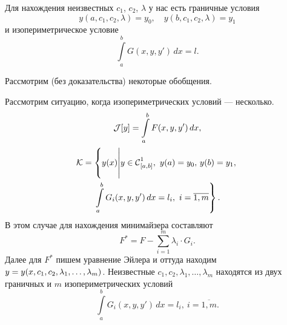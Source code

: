 Для нахождения неизвестных $c_1$, $c_2$, $\lambda$ у нас есть граничные условия 
\begin{equation*}
	 y(a,c_1,c_2,\lambda)=y_0,\quad y(b,c_1,c_2,\lambda)=y_1
\end{equation*}
и изопериметрическое условие
\begin{equation*}
	\int\limits_a^b G(x,y,y')\,dx=l.
\end{equation*} 

Рассмотрим (без доказательства) некоторые обобщения.
\begin{enumerateD}
	\item Рассмотрим ситуацию, когда изопериметрических условий --- несколько.
	\begin{multline*}
		\J[y]=\int\limits_a^b F(x,y,y')\,dx,\\ \K=\left\{y(x)\middle|y\in\Cfn[{[a,b]}]{1},\ y(a)=y_0,\,y(b)=y_1,\vphantom{\int\limits_a^b}\right.\\\left. \int\limits_a^b G_i(x,y,y')\,dx=l_i,\ i=\overline{1,m}\right\}.
	\end{multline*}
	В этом случае для нахождения минимайзера составляют 
	\begin{equation*}
		 F^{\ast}=F-\sum\limits_{i=1}^m\lambda_i\cdot G_i.
	\end{equation*}
	Далее для $F^{\ast}$ пишем уравнение Эйлера и оттуда находим $y\?=y(x,c_1,c_2,\lambda_1,\ldots,\lambda_m)$. Неизвестные $c_1,c_2,\lambda_1,\ldots,\lambda_m$ находятся из двух граничных и $m$ изопериметрических условий
	\begin{equation*}
		\int\limits_a^b G_i(x,y,y')\,dx=l_i,\ i=\overline{1,m}.
	\end{equation*}
	

\end{enumerateD}
